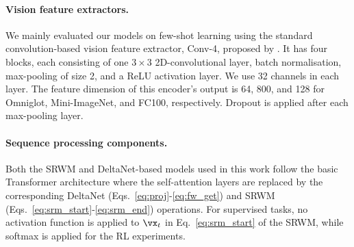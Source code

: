 \documentclass[nohyperref]{article}
\theoremstyle{plain}
\theoremstyle{definition}
\theoremstyle{remark}
\begin{document}
\paragraph{Vision feature extractors.}
We mainly evaluated our models on few-shot learning using the standard convolution-based vision feature extractor, Conv-4, proposed by \citet{VinyalsBLKW16}.
It has four blocks, each consisting of one $3 \times 3$ 2D-convolutional layer, batch normalisation, max-pooling of size 2, and a ReLU activation layer.
We use 32 channels in each layer.
The feature dimension of this encoder's output is 64, 800, and 128 for Omniglot, Mini-ImageNet, and FC100, respectively.
Dropout \citep{hanson1990stochastic, srivastava2014dropout} is applied after each max-pooling layer.

\paragraph{Sequence processing components.}
Both the SRWM and DeltaNet-based models used in this work follow the basic Transformer architecture \citep{trafo} where the self-attention layers are replaced by the corresponding DeltaNet (Eqs.~\ref{eq:proj}-\ref{eq:fw_get}) and SRWM (Eqs.~\ref{eq:srm_start}-\ref{eq:srm_end}) operations.
For supervised tasks, no activation function  is applied to $\vx_t$ in Eq.~\ref{eq:srm_start} of the SRWM, while softmax is applied for the RL experiments.
\end{document}
